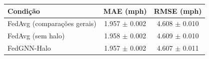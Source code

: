 
\begin{tabular}{lcc}
\toprule
Condição & MAE (mph) & RMSE (mph) \\
\midrule
FedAvg (comparações gerais) & \num{1.957} $\pm$ \num{0.002} & \num{4.608} $\pm$ \num{0.010} \\
FedAvg (sem halo) & \num{1.958} $\pm$ \num{0.002} & \num{4.609} $\pm$ \num{0.010} \\
FedGNN-Halo & \num{1.957} $\pm$ \num{0.002} & \num{4.607} $\pm$ \num{0.011} \\
\bottomrule
\end{tabular}
